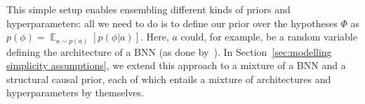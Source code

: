 \documentclass{article}
\DeclareMathOperator*{\E}{\mathbb{E}}
\newcommand{\frank}[1]{\todo[inline,color=yellow]{Frank: #1}}
\newcommand{\sam}[1]{\todo[inline,color=green]{Sam: #1}}
\begin{document}
This simple setup enables ensembling different kinds of priors
and hyperparameters: all we need to do is to define our prior over the hypotheses $\Phi$ as $p(\phi) = \E_{a \sim p(a)}[p(\phi|a)]$.
Here, $a$ could, for example, be a random variable defining the architecture of a BNN (as done by~\citet{muller-iclr2022}). 
In Section~\ref{sec:modelling simplicity assumptions}, we extend this approach to a mixture of a BNN and a structural causal prior,
each of which entails a mixture of architectures and hyperparameters by themselves.
%
\end{document}
